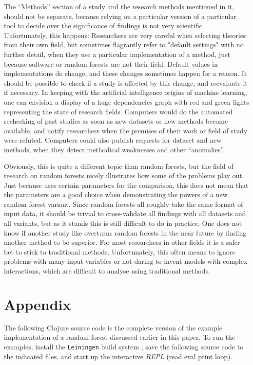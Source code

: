 \documentclass[a4paper,man,12pt,apacite,floatsintext]{apa6} %
\begin{document}
The “Methods” section of a study and the research methods mentioned in it,
should not be separate, because relying on a particular version of a particular
tool to decide over the significance of findings is not very scientific.
Unfortunately, this happens:
Researchers are very careful when selecting theories from their own field,
but sometimes flagrantly refer to "default settings" with no further detail,
when they use a particular implementation of a method,
just because software or random forests are not their field.
Default values in implementations do change, and these changes sometimes
happen for a reason.
It should be possible to check if a study is affected by this change,
and reevaluate it if necessary.
In keeping with the artificial intelligence origins of machine learning,
one can envision a display of a huge dependencies graph with
red and green lights representing the state of research fields.
Computers would do the automated rechecking of past studies as soon as
new datasets or new methods become available, and notify researchers
when the premises of their work or field of study were refuted.
Computers could also publish requests for dataset and new methods,
when they detect methodical weaknesses and other “anomalies”.

Obviously, this is quite a different topic than random forests, but the
field of research on random forests nicely illustrates how some of the
problems play out.
Just because  uses certain parameters for the
comparison, this does not mean that the parameters are a good choice when
demonstrating the powers of a new random forest variant.
Since random forests all roughly take the same format of input data,
it should be trivial to cross-validate all findings with all
datasets and all variants, but as it stands this is still difficult to do in practice.
One does not know if another study like 
overturns random forests in the near future by finding another method to be
superior.
For most researchers in other fields it is a safer bet to stick to
traditional methods.
Unfortunately, this often means to ignore problems with many input variables
or not daring to invent models with complex interactions,
which are difficult to analyse using traditional methods.

\newpage
\section{Appendix}
The following Clojure source code is the complete version of the
example implementation of a random forest discussed earlier in this paper.
To run the examples, install the \texttt{Leiningen} build system
\cite{leiningen}, save the following source code to the indicated files,
and start up the interactive \emph{REPL} (read eval print loop).
\end{document}

